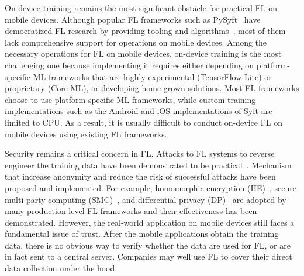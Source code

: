 \documentclass[conference]{IEEEtran}
\begin{document}
On-device training remains the most significant obstacle for
practical FL on mobile devices.
Although popular FL frameworks such as
PySyft~\cite{ryffel2018generic,Ziller2021,hall2021syft}
have democratized FL research by providing tooling and
algorithms~\cite{sriraman2022device},
most of them lack comprehensive support for operations on mobile devices.
Among the necessary operations for FL on mobile devices,
on-device training is the most challenging one because
implementing it requires either depending on
platform-specific ML frameworks that are highly experimental (TensorFlow Lite)
or proprietary (Core ML),
or developing home-grown solutions.
Most FL frameworks choose to use platform-specific ML frameworks,
while custom training implementations such as
the Android and iOS implementations of Syft are limited to CPU.
As a result, it is usually difficult to conduct on-device FL
on mobile devices using existing FL frameworks.

Security remains a critical concern in FL.
Attacks to FL systems to reverse engineer the training data have been
demonstrated to be practical~\cite{sun2019really}.
Mechanism that increase anonymity and
reduce the risk of successful attacks have been proposed and implemented.
For example,
homomorphic encryption (HE)~\cite{wang2020homo},
secure multi-party computing (SMC)~\cite{bonawitz2016practical}, and
differential privacy
(DP)~\cite{dwork2006differential,geyer2017differentially} are
adopted by many production-level FL frameworks and
their effectiveness has been demonstrated.
However, the real-world application on mobile devices still faces a fundamental
issue of trust.
After the mobile applications obtain the training data,
there is no obvious way to verify whether the data are used for FL,
or are in fact sent to a central server.
Companies may well use FL to cover their direct data collection under the hood.

\printbibliography

\end{document}
